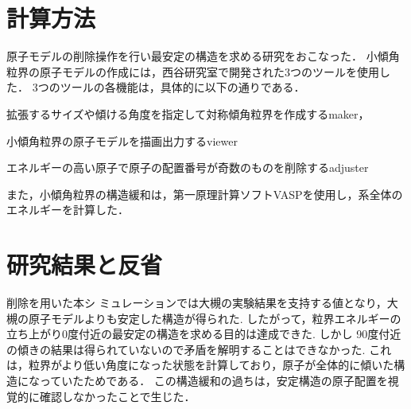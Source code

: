 
\section{計算方法}
原子モデルの削除操作を行い最安定の構造を求める研究をおこなった．
小傾角粒界の原子モデルの作成には，西谷研究室で開発された3つのツールを使用した．
3つのツールの各機能は，具体的に以下の通りである．

拡張するサイズや傾ける角度を指定して対称傾角粒界を作成するmaker，

小傾角粒界の原子モデルを描画出力するviewer

エネルギーの高い原子で原子の配置番号が奇数のものを削除するadjuster

また，小傾角粒界の構造緩和は，第一原理計算ソフトVASPを使用し，系全体のエネルギーを計算した．

\section{研究結果と反省}
削除を用いた本シ ミュレーションでは大槻の実験結果を支持する値となり，大槻の原子モデルよりも安定した構造が得られた. 
したがって，粒界エネルギーの立ち上がり0度付近の最安定の構造を求める目的は達成できた. 
しかし 90度付近の傾きの結果は得られていないので矛盾を解明することはできなかった.
これは，粒界がより低い角度になった状態を計算しており，原子が全体的に傾いた構造になっていたためである．
この構造緩和の過ちは，安定構造の原子配置を視覚的に確認しなかったことで生じた．


